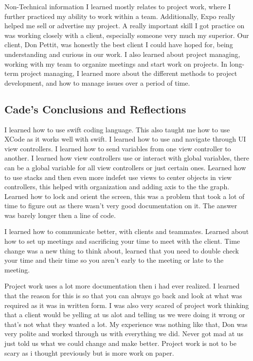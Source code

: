 \documentclass[onecolumn, draftclsnofoot,10pt, compsoc]{IEEEtran}
\begin{document}
Non-Technical information I learned mostly relates to project work, where I further practiced my ability to work within a team.
Additionally, Expo really helped me sell or advertise my project.
A really important skill I got practice on was working closely with a client, especially someone very much my superior.
Our client, Don Pettit, was honestly the best client I could have hoped for, being understanding and curious in our work.
I also learned about project managing, working with my team to organize meetings and start work on projects.
In long-term project managing, I learned more about the different methods to project development, and how to manage issues over a period of time.


\subsection{Cade's Conclusions and Reflections}
I learned how to use swift coding language. This also taught me how to use XCode as it works well with swift. I learned how to use and navigate through UI view controllers. I learned how to send variables from one view controller to another. I learned how view controllers use or interact with global variables, there can be a global variable for all view controllers or just certain ones. Learned how to use stacks and then even more indefet use views to center objects in view controllers, this helped with organization and adding axis to the the graph. Learned how to lock and orient the screen, this was a problem that took a lot of time to figure out as there wasn't very good documentation on it. The answer was barely longer then a line of code.

I learned how to communicate better, with clients and teammates. Learned about how to set up meetings and sacrificing your time to meet with the client. Time change was a new thing to think about, learned that you need to double check your time and their time so you aren't early to the meeting or late to the meeting.

    Project work uses a lot more documentation then i had ever realized. I learned that the reason for this is so that you can always go back and look at what was required as it was in written form. I was also very scared of project work thinking that a client would be yelling at us alot and telling us we were doing it wrong or that's not what they wanted a lot. My experience was nothing like that, Don was very polite and worked through us with everything we did. Never got mad at us just told us what we could change and make better. Project work is not to be scary as i thought previously but is more work on paper.
\end{document}

